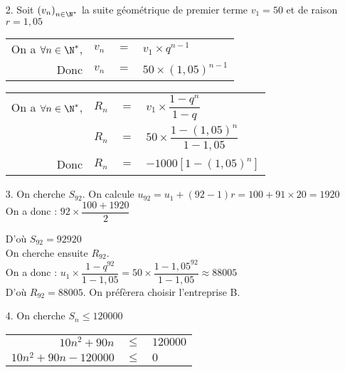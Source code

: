 \newpage

\begin{itemize}
\item[2.] Soit $\left(v_n\right)_{n\in \N^*}$ la suite géométrique de premier terme $v_1 = 50$ et de raison $r = 1,05$ \\

\begin{tabular}{rrll}
On a $\forall n \in \N^*$, & $v_n$ & $ =$ & $ v_1 \times q^{n-1}$ \\
Donc & $v_n$ & $=$ & $50 \times \left(1,05\right)^{n-1}$ \\
\end{tabular}

\vspace*{.3cm} 

\begin{tabular}{rrll}
On a $\forall n \in \N^*$, & $R_n$ & $ = $ & $ v_1\times \dfrac{1-q^n}{1-q}$ \vspace*{.3cm} \\
& $R_n$ & $=$ & $50 \times \dfrac{1-\left(1,05\right)^{n}}{1- 1,05}$ \vspace*{.3cm} \\
Donc & $R_n$ & $=$ & $-1000\left[1 - \left(1,05\right)^n\right]$ \vspace*{.3cm} \\
\end{tabular}

\item[3.] On cherche $S_{92}$. On calcule $u_{92} = u_1 + \left(92-1\right)r = 100 + 91\times 20 = 1920$ \\

On a donc : $92 \times \dfrac{100 + 1920}{2}$

D'où $S_{92} = 92920$ \\

On cherche ensuite $R_{92}$. \\

On a donc : $u_1 \times \dfrac{1 - q^{92}}{1 - 1,05} = 50 \times \dfrac{1-1,05^{92}}{1-1,05} \approx 88005$ \\

D'où $R_{92} = 88005$. On préfèrera choisir l'entreprise B. \\

\item[4.] On cherche $S_n \leqslant 120 000$ \\

\begin{tabular}{rll}
$10n^2 + 90n$ & $ \leqslant $ & $ 120 000$ \\
$10n^2 + 90n - 120 000$ & $ \leqslant $ & $0$ \\
\end{tabular}


\end{itemize}
